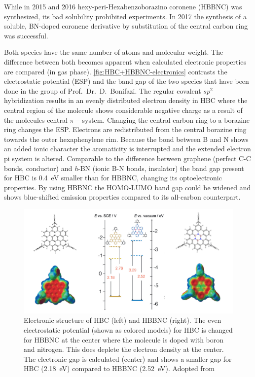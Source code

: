 While in 2015 \cite{Krieg_construction_2015} and 2016 \cite{Ciccullo_Quasi-Free-Standing_2016} hexy-peri-Hexabenzoborazino coronene (HBBNC) was synthesized, its bad solubility prohibited experiments. In 2017 the synthesis \cite{dosso_synthesis_2017} of a soluble, BN-doped coronene derivative by substitution of the central carbon ring was successful. 

Both species have the same number of atoms and molecular weight. The difference between both becomes apparent when calculated electronic properties are compared (in gas phase). \autoref{fig:HBC+HBBNC-electronics} contrasts the electrostatic potential (ESP) and the band gap of the two species that have been done in the group of Prof.\ Dr.\ D.\ Bonifazi. The regular covalent $sp^2$ hybridization results in an evenly distributed electron density in HBC where the central region of the molecule shows considerable negative charge as a result of the molecules central $\pi-$system. Changing the central carbon ring to a borazine ring changes the ESP. Electrons are redistributed from the central borazine ring towards the outer hexaphenylene rim. Because the bond between B and N shows an added ionic character the aromaticity is interrupted and the extended electron pi system is altered. Comparable to the difference between graphene (perfect C-C bonds, conductor) and \textit{h}-BN (ionic B-N bonds, insulator) the band gap present for HBC is \SI{0.4}{\eV} smaller than for HBBNC, changing its optoelectronic properties. By using HBBNC the HOMO-LUMO band gap could be widened and shows blue-shifted emission properties\cite{dosso_synthesis_2017} compared to its all-carbon counterpart.

\begin{figure}[]\centering
	\includegraphics[width=\textwidth]{./images/dosso-combined}
	\caption{Electronic structure of HBC (left) and HBBNC (right). The even electrostatic potential (shown as colored models) for HBC is changed for HBBNC at the center where the molecule is doped with boron and nitrogen. This does deplete the electron density at the center. The electronic gap is calculated (center) and shows a smaller gap for HBC (\SI{2.18}{\eV}) compared to HBBNC (\SI{2.52}{\eV}). Adopted from \cite{dosso_synthesis_2017}}
	\label{fig:HBC+HBBNC-electronics}
\end{figure}


